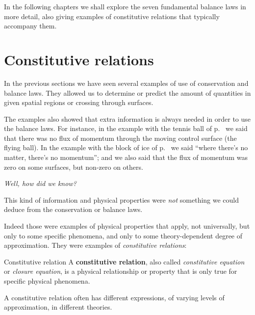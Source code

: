 \documentclass[a4paper,12pt,%
onecolumn,oneside,titlepage,%
british%
]{memoir}
\renewcommand*{\|}[1][]{\nonscript\:#1\vert\nonscript\:\mathopen{}}
\begin{document}
In the following chapters we shall explore the seven fundamental balance laws in more detail, also giving examples of constitutive relations that typically accompany them.




\section{Constitutive relations}
\label{sec:constitutive}

In the previous sections we have seen several examples of use of conservation and balance laws. They allowed us to determine or predict the amount of quantities in given spatial regions or crossing through surfaces.

%
The examples also showed that extra information is always needed in order to use the balance laws. For instance, in the example with the tennis ball of p.~\pageref{sec:example_balance_vect} we said that there was no flux of momentum through the moving control surface (the flying ball). In the example with the block of ice of p.~\pageref{sec:example_balance_static} we said \enquote{where there's no matter, there's no momentum}; and we also said that the flux of momentum was zero on some surfaces, but non-zero on others.

\emph{Well, how did we know?}

This kind of information and physical properties were \emph{not} something we could deduce from the conservation or balance laws.

Indeed those were examples of physical properties that apply, not universally, but only to some specific phenomena, and only to some theory-dependent degree of approximation. They were examples of \emph{constitutive relations}:
\begin{definition}{Constitutive relation}
  A \textbf{constitutive relation}, also called \emph{constitutive equation} or \emph{closure equation}, is a physical relationship or property that is only true for specific physical phenomena.

  \smallskip

  A constitutive relation often has different expressions, of varying levels of approximation, in different theories.
\end{definition}
\end{document}
